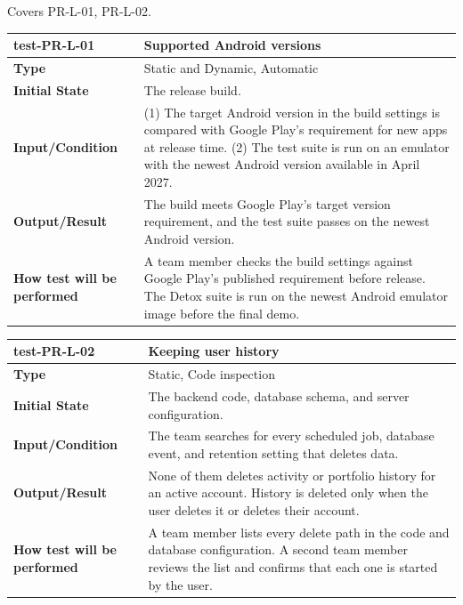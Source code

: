 \documentclass[12pt, titlepage]{article}
\begin{document}
Covers PR-L-01, PR-L-02.

\noindent\begin{tabularx}{\textwidth}{>{\raggedright\arraybackslash}p{3.5cm}X}
  \toprule
  \textbf{test-PR-L-01} & \textbf{Supported Android versions}\\
  \midrule
  \textbf{Type} & Static and Dynamic, Automatic\\
  \textbf{Initial State} & The release build.\\
  \textbf{Input/Condition} & (1) The target Android version in the build settings is compared with Google Play's requirement for new apps at release time. (2) The test suite is run on an emulator with the newest Android version available in April 2027.\\
  \textbf{Output/Result} & The build meets Google Play's target version requirement, and the test suite passes on the newest Android version.\\
  \textbf{How test will be performed} & A team member checks the build settings against Google Play's published requirement before release. The Detox suite is run on the newest Android emulator image before the final demo.\\
  \bottomrule
\end{tabularx}

\vspace{1em}

\noindent\begin{tabularx}{\textwidth}{>{\raggedright\arraybackslash}p{3.5cm}X}
  \toprule
  \textbf{test-PR-L-02} & \textbf{Keeping user history}\\
  \midrule
  \textbf{Type} & Static, Code inspection\\
  \textbf{Initial State} & The backend code, database schema, and server configuration.\\
  \textbf{Input/Condition} & The team searches for every scheduled job, database event, and retention setting that deletes data.\\
  \textbf{Output/Result} & None of them deletes activity or portfolio history for an active account. History is deleted only when the user deletes it or deletes their account.\\
  \textbf{How test will be performed} & A team member lists every delete path in the code and database configuration. A second team member reviews the list and confirms that each one is started by the user.\\
  \bottomrule
\end{tabularx}
\end{document}

